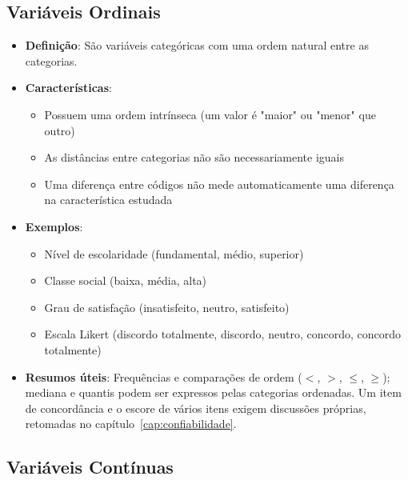 \subsection{Variáveis Ordinais}

\begin{itemize}
    \item \textbf{Definição}: São variáveis categóricas com uma ordem natural entre as categorias.
    \item \textbf{Características}:
    \begin{itemize}
        \item Possuem uma ordem intrínseca (um valor é "maior" ou "menor" que outro)
        \item As distâncias entre categorias não são necessariamente iguais
        \item Uma diferença entre códigos não mede automaticamente uma diferença na característica estudada
    \end{itemize}
    \item \textbf{Exemplos}:
    \begin{itemize}
        \item Nível de escolaridade (fundamental, médio, superior)
        \item Classe social (baixa, média, alta)
        \item Grau de satisfação (insatisfeito, neutro, satisfeito)
        \item Escala Likert (discordo totalmente, discordo, neutro, concordo, concordo totalmente)
    \end{itemize}
    \item \textbf{Resumos úteis}: Frequências e comparações de ordem ($<$, $>$, $\leq$, $\geq$); mediana e quantis podem ser expressos pelas categorias ordenadas. Um item de concordância e o escore de vários itens exigem discussões próprias, retomadas no capítulo~\ref{cap:confiabilidade}.
\end{itemize}

\subsection{Variáveis Contínuas}

